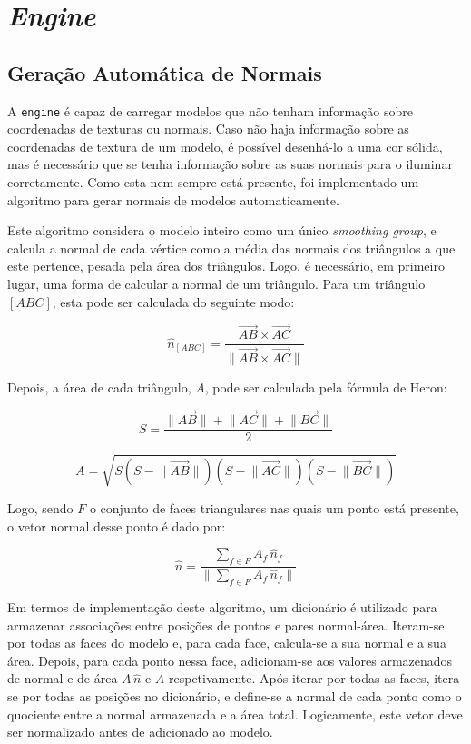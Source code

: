 \documentclass[12pt, a4paper]{article}
\begin{document}
\section{\emph{Engine}}

\subsection{Geração Automática de Normais}

A \texttt{engine} é capaz de carregar modelos que não tenham informação sobre coordenadas de
texturas ou normais. Caso não haja informação sobre as coordenadas de textura de um modelo, é
possível desenhá-lo a uma cor sólida, mas é necessário que se tenha informação sobre as suas normais
para o iluminar corretamente. Como esta nem sempre está presente, foi implementado um algoritmo para
gerar normais de modelos automaticamente.

Este algoritmo considera o modelo inteiro como um único \emph{smoothing group}, e calcula a normal
de cada vértice como a média das normais dos triângulos a que este pertence, pesada pela área dos
triângulos. Logo, é necessário, em primeiro lugar, uma forma de calcular a normal de um triângulo.
Para um triângulo $[ABC]$, esta pode ser calculada do seguinte modo:

$$
\hat{n}_{[ABC]} = \frac{
    \overrightarrow{AB} \times \overrightarrow{AC}
}{
    \lVert \overrightarrow{AB} \times \overrightarrow{AC} \rVert
}
$$

Depois, a área de cada triângulo, $A$, pode ser calculada pela fórmula de Heron:

$$
S = \frac{
    \lVert \overrightarrow{AB} \rVert +
    \lVert \overrightarrow{AC} \rVert +
    \lVert \overrightarrow{BC} \rVert
}{
    2
}
$$

$$
A = \sqrt{
    S
    \left ( S - \lVert \overrightarrow{AB} \rVert \right )
    \left ( S - \lVert \overrightarrow{AC} \rVert \right )
    \left ( S - \lVert \overrightarrow{BC} \rVert \right )
}
$$

Logo, sendo $F$ o conjunto de faces triangulares nas quais um ponto está presente, o vetor normal
desse ponto é dado por:

$$
\hat{n} = \frac{
    \sum_{f \in F} {A_f \, \hat{n}_f}
}{
    \lVert \sum_{f \in F} {A_f \, \hat{n}_f} \rVert
}
$$

Em termos de implementação deste algoritmo, um dicionário é utilizado para armazenar associações
entre posições de pontos e pares normal-área. Iteram-se por todas as faces do modelo e, para
cada face, calcula-se a sua normal e a sua área. Depois, para cada ponto nessa face, adicionam-se
aos valores armazenados de normal e de área $A \, \hat{n}$ e $A$ respetivamente. Após iterar por
todas as faces, itera-se por todas as posições no dicionário, e define-se a normal de cada ponto
como o quociente entre a normal armazenada e a área total. Logicamente, este vetor deve ser
normalizado antes de adicionado ao modelo.
\end{document}
